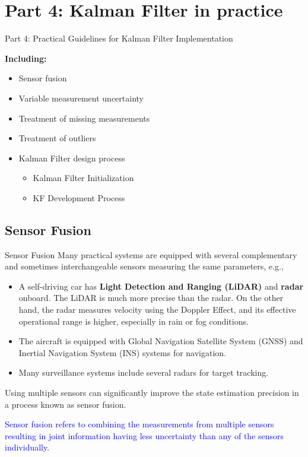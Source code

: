\section{Part 4: Kalman Filter in practice}

\begin{frame}{Part 4: Practical Guidelines for Kalman Filter Implementation}
		
		\textbf{Including:}
				
		\begin{itemize}
			\item Sensor fusion 
			\item Variable measurement uncertainty
                \item Treatment of missing measurements 
                \item Treatment of outliers
                \item Kalman Filter design process
                \begin{itemize}
                    \item Kalman Filter Initialization
                    \item KF Development Process
                \end{itemize}
		\end{itemize}
\end{frame}

\subsection{Sensor Fusion}
\begin{frame}{Sensor Fusion}
    Many practical systems are equipped with several complementary and sometimes interchangeable sensors measuring the same parameters, e.g., 
    \begin{itemize}
        \item A self-driving car has \textbf{Light Detection and Ranging (LiDAR)} and \textbf{radar} onboard. The LiDAR is much more precise than the radar. On the other hand, the radar measures velocity using the Doppler Effect, and its effective operational range is higher, especially in rain or fog conditions.
        \item The aircraft is equipped with Global Navigation Satellite System (GNSS) and Inertial Navigation System (INS) systems for navigation.
        \item Many surveillance systems include several radars for target tracking.
    \end{itemize}

    Using multiple sensors can significantly improve the state estimation precision in a process known as sensor fusion.

    \textcolor{blue}{Sensor fusion refers to combining the measurements from multiple sensors resulting in joint information having less uncertainty than any of the sensors individually.}
\end{frame}


